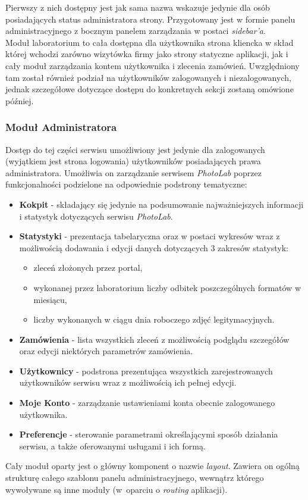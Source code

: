 Pierwszy z nich dostępny jest jak sama nazwa wskazuje jedynie dla osób posiadających status administratora strony. Przygotowany jest w formie panelu administracyjnego z bocznym panelem zarządzania w postaci \textit{sidebar'a}. \\Moduł laboratorium to cała dostępna dla użytkownika strona kliencka w skład której wchodzi zarówno wizytówka firmy jako strony statyczne aplikacji, jak i cały moduł zarządzania kontem użytkownika i zlecenia zamówień. Uwzględniony tam został również podział na użytkowników zalogowanych i niezalogowanych, jednak szczegółowe dotyczące dostępu do konkretnych sekcji zostaną omówione później.

\newpage
\subsubsection{Moduł Administratora}
\quad Dostęp do tej części serwisu umożliwiony jest jedynie dla zalogowanych (wyjątkiem jest strona logowania) użytkowników posiadających prawa administratora. Umożliwia on zarządzanie serwisem \textit{PhotoLab} poprzez funkcjonalności podzielone na odpowiednie podstrony tematyczne:
 \begin{itemize}
     \item \textbf{Kokpit} - składający się jedynie na podsumowanie najważniejszych informacji i statystyk dotyczących serwisu \textit{PhotoLab}.
     \item \textbf{Statystyki} - prezentacja tabelaryczna oraz w postaci wykresów wraz z możliwością dodawania i edycji danych dotyczących 3 zakresów statystyk:
        \begin{itemize}
            \item zleceń złożonych przez portal,
            \item wykonanej przez laboratorium liczby odbitek poszczególnych formatów w miesiącu,
            \item liczby wykonanych w ciągu dnia roboczego zdjęć legitymacyjnych.
        \end{itemize}
    \item \textbf{Zamówienia} - lista wszystkich zleceń z możliwością podglądu szczegółów oraz edycji niektórych parametrów zamówienia.
    \item \textbf{Użytkownicy} - podstrona prezentująca wszystkich zarejestrowanych użytkowników serwisu wraz z możliwością ich pełnej edycji.
    \item \textbf{Moje Konto} - zarządzanie ustawieniami konta obecnie zalogowanego użytkownika.
    \item \textbf{Preferencje} - sterowanie parametrami określającymi sposób działania serwisu, a także oferowanymi usługami i ich formą.
 \end{itemize}
Cały moduł oparty jest o główny komponent o nazwie \textit{layout}. Zawiera on ogólną strukturę całego szablonu panelu administracyjnego, wewnątrz którego wywoływane są inne moduły (w~oparciu o \textit{routing} aplikacji).

